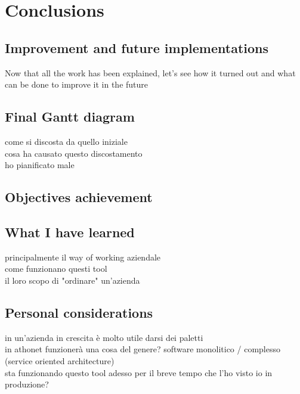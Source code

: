 \chapter{Conclusions}
\label{conclusions}

\section{Improvement and future implementations}

Now that all the work has been explained, let's see how it turned out and what can be done to improve it in the future

\section{Final Gantt diagram}
	come si discosta da quello iniziale\\
	cosa ha causato questo discostamento\\
	ho pianificato male
	
\section{Objectives achievement}

\section{What I have learned}
	principalmente il way of working aziendale\\
	come funzionano questi tool\\
	il loro scopo di "ordinare" un'azienda

\section{Personal considerations}
	in un'azienda in crescita è molto utile darsi dei paletti\\
	in athonet funzionerà una cosa del genere?  software monolitico / complesso (service oriented architecture)\\
	sta funzionando questo tool adesso per il breve tempo che l'ho visto io in produzione?
